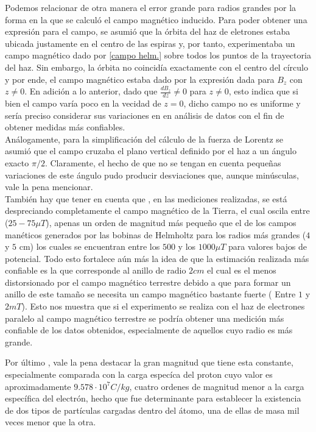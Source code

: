 \documentclass[prb,aps,twocolumn,preprintnumbers,amsmath,amssymb]{revtex4}
\begin{document}
Podemos relacionar de otra manera el error grande para radios grandes por la forma en la que se calculó el campo magnético inducido. Para poder obtener una expresión para el campo, se asumió que la órbita del haz de eletrones estaba ubicada justamente en el centro de las espiras y, por tanto, experimentaba un campo magnético dado por \eqref{campo helm.} sobre todos los puntos de la trayectoria del haz. Sin embargo, la órbita no coincidía exactamente con el centro del círculo y por ende, el campo magnético estaba dado por la expresión dada para $B_{z}$ con $z \neq 0$. En adición a lo anterior, dado que $\frac{dB_{z}}{dz} \neq 0$ para $z \neq 0$, esto indica que si bien el campo varía poco en la vecidad de $z = 0$, dicho campo no es uniforme y sería preciso considerar sus variaciones en en análisis de datos con el fin de obtener medidas más confiables.\\  


Análogamente, para la simplificación del cálculo de la fuerza de Lorentz se asumió que el campo cruzaba el plano vertical definido por el haz a un ángulo exacto $ \pi /2 $. Claramente, el hecho de que no se tengan en cuenta pequeñas variaciones de este ángulo pudo producir desviaciones que, aunque minúsculas, vale la pena mencionar. \\

También hay que tener en cuenta que , en las mediciones realizadas, se está despreciando completamente el campo magnético de la Tierra, el cual oscila entre ($25-75 \mu T$), apenas un orden de magnitud más pequeño que el de los campos manéticos generados por las bobinas de Helmholtz para los radios más grandes ($4$ y $5$ cm) los cuales se encuentran entre los $500$ y los $1000 \mu T$ para valores bajos de potencial. Todo esto fortalece aún más la idea de que la estimación realizada más confiable es la que corresponde al anillo de radio $2cm$ el cual  es el menos distorsionado por el campo magnético terrestre debido a que para formar un anillo de este tamaño se necesita un campo magnético bastante fuerte ( Entre $1$ y $2 mT$). Esto nos muestra que si el experimento se realiza con el haz de electrones paralelo al campo magnético terrestre se podría obtener una medición más confiable de los datos obtenidos, especialmente de aquellos cuyo radio es más grande. 

Por último , vale la pena destacar la gran magnitud que tiene esta constante, especialmente comparada con la carga especíca del proton cuyo valor es aproximadamente $9.578 \cdot 10^7 C/kg$, cuatro ordenes de magnitud menor a la carga específica del electrón, hecho que fue determinante para establecer la existencia de dos tipos de partículas cargadas dentro del átomo, una de ellas de masa mil veces menor que la otra.\\
\end{document}
